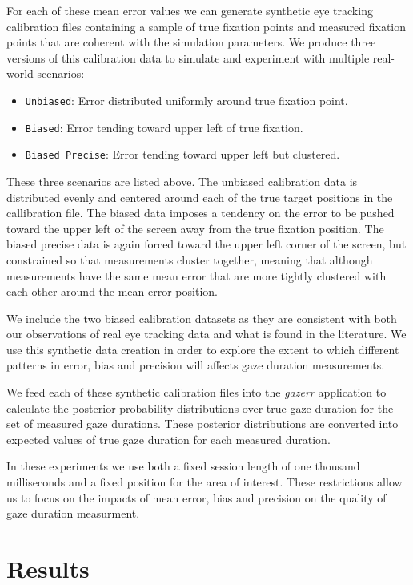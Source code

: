 \documentclass[sigconf]{acmart}
\numberwithin{equation}{section}
\begin{document}
For each of these mean error values we can generate synthetic eye tracking calibration 
files containing a sample of true fixation points and measured fixation points that are
coherent with the simulation parameters. 
We produce three versions of this calibration data to simulate and experiment with
multiple real-world scenarios:

\begin{itemize}
    \item {\texttt{Unbiased}}: Error distributed uniformly around true fixation point. 
    \item {\texttt{Biased}}: Error tending toward upper left of true fixation.
    \item {\texttt{Biased Precise}}: Error tending toward upper left but clustered.
\end{itemize}

These three scenarios are listed above. The unbiased calibration data is
distributed evenly and centered around each of the true target positions in the callibration
file. The biased data imposes a tendency on the error to be pushed toward the upper left 
of the screen away from the true fixation position. The biased precise data is again forced
toward the upper left corner of the screen, but constrained so that measurements cluster
together, meaning that although measurements have the same mean error that are more tightly
clustered with each other around the mean error position.

We include the two biased calibration datasets as they are consistent with both our 
observations of real eye tracking data and what is found in the literature\cite{Holmqvist2022}.
We use this synthetic data creation in order to explore the extent to which different
patterns in error, bias and precision will affects gaze duration measurements.

We feed each of these synthetic calibration files into the \textit{gazerr} application
to calculate the posterior probability distributions over true gaze duration for 
the set of measured gaze durations. These posterior distributions are converted 
into expected values of true gaze duration for each measured duration.

In these experiments we use both a fixed session length of one thousand milliseconds
and a fixed position for the area of interest. These restrictions allow us to focus 
on the impacts of mean error, bias and precision on the quality of gaze duration measurment.

\section{Results}
\end{document}
